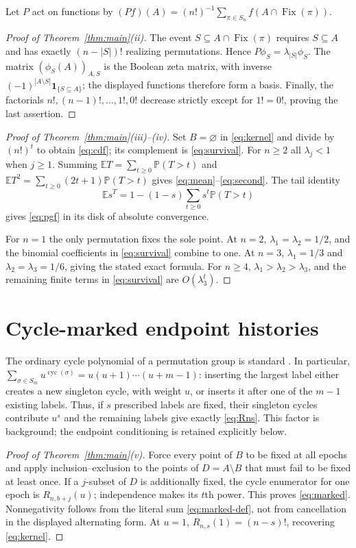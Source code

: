 \documentclass[a4paper,10pt]{amsart}
\theoremstyle{remark}
\newcommand{\Fix}{\operatorname{Fix}}
\newcommand{\cyc}{\operatorname{cyc}}
\newcommand{\E}{\mathbb E}
\newcommand{\Prb}{\mathbb P}
\newcommand{\ind}{\mathbf 1}
\begin{document}
Let $P$ act on functions by
$(Pf)(A)=(n!)^{-1}\sum_{\pi\in S_n}f(A\cap\Fix(\pi))$.

\begin{proof}[Proof of Theorem~\ref{thm:main}(ii)]
The event $S\subseteq A\cap\Fix(\pi)$ requires $S\subseteq A$ and has
exactly $(n-|S|)!$ realizing permutations.  Hence
$P\phi_S=\lambda_{|S|}\phi_S$.  The matrix
$(\phi_S(A))_{A,S}$ is the Boolean zeta matrix, with inverse
$(-1)^{|A\setminus S|}\ind_{\{S\subseteq A\}}$; the displayed functions
therefore form a basis.  Finally, the factorials
$n!, (n-1)!,\ldots,1!,0!$ decrease strictly except for $1!=0!$, proving the
last assertion.
\end{proof}

\begin{proof}[Proof of Theorem~\ref{thm:main}(iii)--(iv)]
Set $B=\varnothing$ in \eqref{eq:kernel} and divide by $(n!)^t$ to obtain
\eqref{eq:cdf}; its complement is \eqref{eq:survival}.  For $n\ge2$ all
$\lambda_j<1$ when $j\ge1$.  Summing
$\E T=\sum_{t\ge0}\Prb(T>t)$ and
$\E T^2=\sum_{t\ge0}(2t+1)\Prb(T>t)$ gives
\eqref{eq:mean}--\eqref{eq:second}.  The tail identity
\[
 \E s^T=1-(1-s)\sum_{t\ge0}s^t\Prb(T>t)
\]
gives \eqref{eq:pgf} in its disk of absolute convergence.

For $n=1$ the only permutation fixes the sole point.  At $n=2$,
$\lambda_1=\lambda_2=1/2$, and the binomial coefficients in
\eqref{eq:survival} combine to one.  At $n=3$,
$\lambda_1=1/3$ and $\lambda_2=\lambda_3=1/6$, giving the stated exact
formula.  For $n\ge4$, $\lambda_1>\lambda_2>\lambda_3$, and the remaining
finite terms in \eqref{eq:survival} are $O(\lambda_3^t)$.
\end{proof}

\section{Cycle-marked endpoint histories}

The ordinary cycle polynomial of a permutation group is standard
\cite{CameronSemeraro2018}.  In particular,
$\sum_{\sigma\in S_m}u^{\cyc(\sigma)}=u(u+1)\cdots(u+m-1)$: inserting the
largest label either creates a new singleton cycle, with weight $u$, or
inserts it after one of the $m-1$ existing labels.  Thus, if $s$ prescribed
labels are fixed, their singleton cycles contribute $u^s$ and the remaining
labels give exactly \eqref{eq:Rns}.  This factor is background; the endpoint
conditioning is retained explicitly below.

\begin{proof}[Proof of Theorem~\ref{thm:main}(v)]
Force every point of $B$ to be fixed at all epochs and apply
inclusion--exclusion to the points of $D=A\setminus B$ that must fail to be
fixed at least once.  If a $j$-subset of $D$ is additionally fixed, the
cycle enumerator for one epoch is $R_{n,b+j}(u)$; independence makes its
$t$th power.  This proves \eqref{eq:marked}.  Nonnegativity follows from the
literal sum \eqref{eq:marked-def}, not from cancellation in the displayed
alternating form.  At $u=1$, $R_{n,s}(1)=(n-s)!$, recovering
\eqref{eq:kernel}.
\end{proof}
\end{document}

